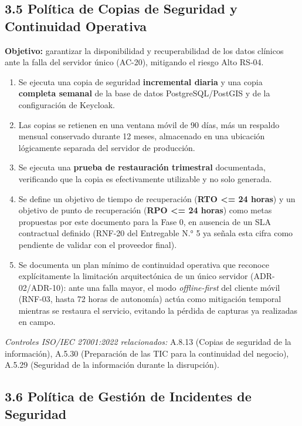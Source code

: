 \documentclass[11pt,a4paper]{article}
\providecommand{\tightlist}{%
  \setlength{\itemsep}{0pt}\setlength{\parskip}{0pt}}
\begin{document}
\subsection{3.5 Política de Copias de Seguridad y Continuidad Operativa}\label{poluxedtica-de-copias-de-seguridad-y-continuidad-operativa}

\textbf{Objetivo:} garantizar la disponibilidad y recuperabilidad de los datos clínicos ante la falla del servidor único (AC-20), mitigando el riesgo Alto RS-04.

\begin{enumerate}
\def\labelenumi{\arabic{enumi}.}
\tightlist
\item
  Se ejecuta una copia de seguridad \textbf{incremental diaria} y una copia \textbf{completa semanal} de la base de datos PostgreSQL/PostGIS y de la configuración de Keycloak.
\item
  Las copias se retienen en una ventana móvil de 90 días, más un respaldo mensual conservado durante 12 meses, almacenado en una ubicación lógicamente separada del servidor de producción.
\item
  Se ejecuta una \textbf{prueba de restauración trimestral} documentada, verificando que la copia es efectivamente utilizable y no solo generada.
\item
  Se define un objetivo de tiempo de recuperación (\textbf{RTO \textless= 24 horas}) y un objetivo de punto de recuperación (\textbf{RPO \textless= 24 horas}) como metas propuestas por este documento para la Fase 0, en ausencia de un SLA contractual definido (RNF-20 del Entregable N.° 5 ya señala esta cifra como pendiente de validar con el proveedor final).
\item
  Se documenta un plan mínimo de continuidad operativa que reconoce explícitamente la limitación arquitectónica de un único servidor (ADR-02/ADR-10): ante una falla mayor, el modo \emph{offline-first} del cliente móvil (RNF-03, hasta 72 horas de autonomía) actúa como mitigación temporal mientras se restaura el servicio, evitando la pérdida de capturas ya realizadas en campo.
\end{enumerate}

\emph{Controles ISO/IEC 27001:2022 relacionados:} A.8.13 (Copias de seguridad de la información), A.5.30 (Preparación de las TIC para la continuidad del negocio), A.5.29 (Seguridad de la información durante la disrupción).

\subsection{3.6 Política de Gestión de Incidentes de Seguridad}\label{poluxedtica-de-gestiuxf3n-de-incidentes-de-seguridad}
\end{document}

